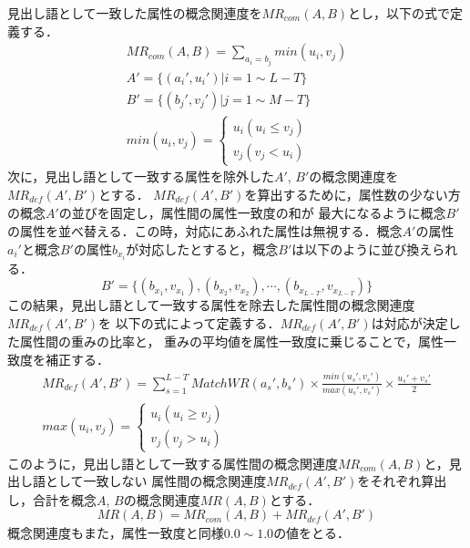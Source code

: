 \documentclass[japanese]{jnlp_1.3e}
\begin{document}
見出し語として一致した属性の概念関連度を$\mathit{MR}_{\mathit{com}}(A,B)$とし，以下の式で定義する．
\begin{gather}
 \mathit{MR}_{\mathit{com}}(A,B)=\sum_{a_i=b_j}\mathit{min}(u_i,v_j) \\
 A' =\{(a_i' ,u_i' )|i=1\sim L-T\} \nonumber\\
 B' =\{(b_j' ,v_j' )|j=1\sim M-T\} \nonumber \\
 \mathit{min}(u_i,v_j)=
  \begin{cases}
   u_i(u_i\leq v_j)\\
   v_j(v_j<u_i)
  \end{cases}
\end{gather} 
次に，見出し語として一致する属性を除外した$A'$, $B'$の概念関連度を$\mathit{MR}_{\mathit{def}}(A',B')$とする．
$\mathit{MR}_{\mathit{def}}(A',B')$を算出するために，属性数の少ない方の概念$A'$の並びを固定し，属性間の属性一致度の和が
最大になるように概念$B'$の属性を並べ替える．この時，対応にあふれた属性は無視する．概念$A'$の属性
$a_i'$と概念$B'$の属性$b_{x_i}$が対応したとすると，概念$B'$は以下のように並び換えられる．
\begin{equation}
B' =\{(b_{x_1},v_{x_1}),(b_{x_2},v_{x_2}),\cdots,(b_{x_{L-T}},v_{x_{L-T}})\}
\end{equation}
この結果，見出し語として一致する属性を除去した属性間の概念関連度$\mathit{MR}_{\mathit{def}}(A',B')$を
以下の式によって定義する．$\mathit{MR}_{\mathit{def}}(A',B')$は対応が決定した属性間の重みの比率と，
重みの平均値を属性一致度に乗じることで，属性一致度を補正する．
\begin{gather}
 \mathit{MR}_{\mathit{def}}(A',B')=\sum_{s=1}^{L-T}\mathit{MatchWR}(a_s',b_s')\times 
	\frac{\mathit{min}(u_s',v_s')}{\mathit{max}(u_s',v_s')}\times \frac{u_s'+v_s'}{2}\\
 \mathit{max}(u_i,v_j)=
  \begin{cases}
   u_i(u_i\geq v_j)\\
   v_j(v_j>u_i)
  \end{cases}
\end{gather} 
このように，見出し語として一致する属性間の概念関連度$\mathit{MR}_{\mathit{com}}(A,B)$と，見出し語として一致しない
属性間の概念関連度$\mathit{MR}_{\mathit{def}}(A',B')$をそれぞれ算出し，合計を概念$A$, $B$の概念関連度$\mathit{MR}(A,B)$とする．
\begin{equation}
 \mathit{MR}(A,B)=\mathit{MR}_{\mathit{com}}(A,B)+\mathit{MR}_{\mathit{def}}(A',B')
\end{equation}
概念関連度もまた，属性一致度と同様$0.0\sim 1.0$の値をとる．
\end{document}

